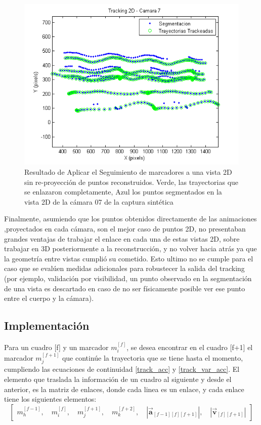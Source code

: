 \begin{figure}[hbt]
\begin{center}
\includegraphics[scale=0.7]{img/Tracking/011_tracking_2D_camara_07.png}
\end{center}
\caption{Resultado de Aplicar el Seguimiento de marcadores a una vista 2D sin re-proyección de puntos reconstruidos. Verde, las trayectorias que se enlazaron completamente, Azul los puntos segmentados en la vista 2D de la cámara 07 de la captura sintética}
\label{tracking_2D_cam_07}
\end{figure}

Finalmente, asumiendo que los puntos obtenidos directamente de las animaciones ,proyectados en cada cámara, son el mejor caso de puntos 2D, no presentaban grandes ventajas de trabajar el enlace en cada una de estas vistas 2D, sobre trabajar en 3D posteriormente a la reconstrucción, y no volver hacia atrás ya que la geometría entre vistas cumplió su cometido. Esto ultimo no se cumple para el caso que se evalúen medidas adicionales para robustecer la salida del tracking (por ejemplo, validación por visibilidad, un punto observado en la segmentación de una vista es descartado en caso de no ser físicamente posible ver ese punto entre el cuerpo y la cámara).

\subsection{Implementación}

Para un cuadro [f] y un marcador $m_{i}^{[f]}$, se desea encontrar en el cuadro [f+1] el marcador $m_{j}^{[f+1]}$ que continúe la trayectoria que se tiene hasta el momento, cumpliendo las ecuaciones de continuidad \ref{track_acc} y \ref{track_var_acc}. El elemento que traslada la información de un cuadro al siguiente y desde el anterior, es la matriz de enlaces, donde cada linea es un enlace, y cada enlace tiene los siguientes elementos:
\begin{equation}
\begin{bmatrix}
  m_{h}^{[f-1]} ,\quad m_{i}^{[f]} ,\quad m_{j}^{[f+1]} ,\quad m_{k}^{[f+2]} ,\quad \left|\boldsymbol{\overrightarrow{a}}_{[f-1][f][f+1]}\right| ,\quad \left|\boldsymbol{\overrightarrow{v}}_{[f][f+1]}\right|
\end{bmatrix}
\end{equation}

